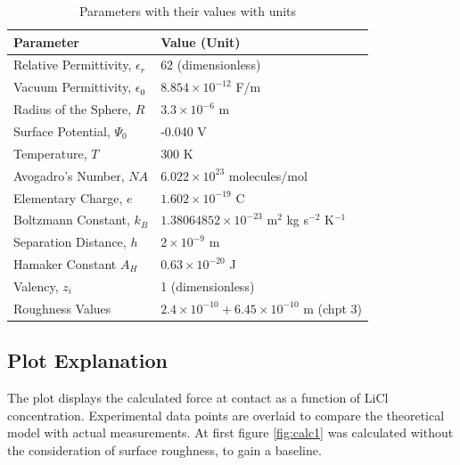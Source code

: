 \begin{table}[h]
\centering
\begin{tabular}{|l|l|}
\hline
\textbf{Parameter} & \textbf{Value (Unit)} \\ \hline
Relative Permittivity, $\epsilon_r$ & 62 (dimensionless) \cite{behrends2006dielectric} \\ \hline
Vacuum Permittivity, $\epsilon_0$ & $8.854 \times 10^{-12}$ F/m \\ \hline
Radius of the Sphere, $R$ & $3.3 \times 10^{-6}$ m \\ \hline
Surface Potential, $\Psi_0$ & -0.040 V \cite{silica2021}\\ \hline
Temperature, $T$ & 300 K \\ \hline
Avogadro's Number, $NA$ & $6.022 \times 10^{23}$ molecules/mol \\ \hline
Elementary Charge, $e$ & $1.602 \times 10^{-19}$ C \\ \hline
Boltzmann Constant, $k_B$ & $1.38064852 \times 10^{-23}$ m\(^2\) kg s\(^{-2}\) K\(^{-1}\) \\ \hline
Separation Distance, $h$ & $2 \times 10^{-9}$ m \\ \hline
Hamaker Constant $A_H$ & $0.63 \times 10^{-20}$ J \cite{Bergstrom1997}\\ \hline
Valency, $z_i$ & 1 (dimensionless) \\ \hline
Roughness Values & $2.4 \times 10^{-10} + 6.45 \times 10^{-10}$ m (chpt 3) \\ \hline
\end{tabular}
\caption{Parameters with their values with units}
\label{table:parameters_units}
\end{table}



\subsection*{Plot Explanation}

The plot displays the calculated force at contact as a function of LiCl concentration. Experimental data points are overlaid to compare the theoretical model with actual measurements. At first figure \ref{fig:calc1} was calculated without the consideration of surface roughness, to gain a baseline.

